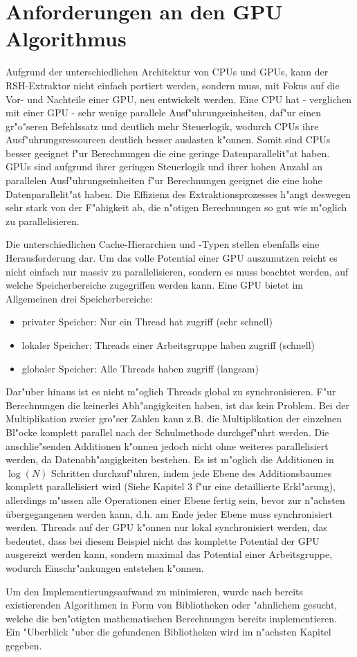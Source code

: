\section{Anforderungen an den GPU Algorithmus}

Aufgrund der unterschiedlichen Architektur von CPUs und GPUs, kann der RSH-Extraktor nicht einfach portiert werden, sondern muss, mit Fokus auf die Vor- und Nachteile einer GPU, neu entwickelt werden. Eine CPU hat - verglichen mit einer GPU - sehr wenige parallele Ausf"uhrungseinheiten, daf"ur einen gr"o"seren Befehlssatz und deutlich mehr Steuerlogik, wodurch CPUs ihre Ausf"uhrungsressourcen deutlich besser auslasten k"onnen. Somit sind CPUs besser geeignet f"ur Berechnungen die eine geringe Datenparallelit"at haben. GPUs sind aufgrund ihrer geringen Steuerlogik und ihrer hohen Anzahl an parallelen Ausf"uhrungseinheiten f"ur Berechnungen geeignet die eine hohe Datenparallelit"at haben. Die Effizienz des Extraktionsprozesses h"angt deswegen sehr stark von der F"ahigkeit ab, die n"otigen Berechnungen so gut wie m"oglich zu parallelisieren. 

Die unterschiedlichen Cache-Hierarchien und -Typen stellen ebenfalls eine Herausforderung dar. Um das volle Potential einer GPU auszunutzen reicht es nicht einfach nur massiv zu parallelisieren, sondern es muss beachtet werden, auf welche Speicherbereiche zugegriffen werden kann. Eine GPU bietet im Allgemeinen drei Speicherbereiche:
\begin{itemize}
	\item privater Speicher: Nur ein Thread hat zugriff (sehr schnell)
	\item lokaler Speicher: Threads einer Arbeitsgruppe haben zugriff (schnell)
	\item globaler Speicher: Alle Threads haben zugriff (langsam)
\end{itemize}
Dar"uber hinaus ist es nicht m"oglich Threads global zu synchronisieren. F"ur Berechnungen die keinerlei Abh"angigkeiten haben, ist das kein Problem. Bei der Multiplikation zweier gro"ser Zahlen kann z.B. die Multiplikation der einzelnen Bl"ocke komplett parallel nach der Schulmethode durchgef"uhrt werden. Die anschlie"senden Additionen k"onnen jedoch nicht ohne weiteres parallelisiert werden, da Datenabh"angigkeiten bestehen. Es ist m"oglich die Additionen in $\log(N)$ Schritten durchzuf"uhren, indem jede Ebene des Additionsbaumes komplett parallelisiert wird (Siehe \cite{haque2012plain} Kapitel 3 f"ur eine detaillierte Erkl"arung), allerdings m"ussen alle Operationen einer Ebene fertig sein, bevor zur n"achsten übergegangenen werden kann, d.h. am Ende jeder Ebene muss synchronisiert werden. Threads auf der GPU k"onnen nur lokal synchronisiert werden, das bedeutet, dass bei diesem Beispiel nicht das komplette Potential der GPU ausgereizt werden kann, sondern maximal das Potential einer Arbeitsgruppe, wodurch Einschr"ankungen entstehen k"onnen.

Um den Implementierungsaufwand zu minimieren, wurde nach bereits existierenden Algorithmen in Form von Bibliotheken oder "ahnlichem gesucht, welche die ben"otigten mathematischen Berechnungen bereits implementieren. Ein "Uberblick "uber die gefundenen Bibliotheken wird im n"achsten Kapitel gegeben.